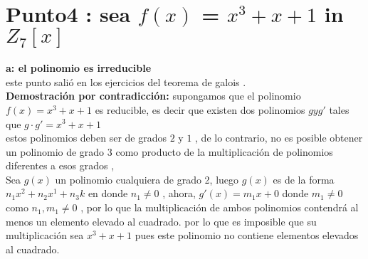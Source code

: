 \documentclass[10pt,a4paper]{article} %
\begin{document}
    \section{Punto4 :  sea $f(x)$ = $x ^{3}  + x + 1 $ in $Z_7[x]$}
    \textbf{a: el polinomio es irreducible}
    \\
    este punto salió en los ejercicios del teorema de galois .
    \\
    \textbf{Demostración por contradicción:} supongamos que el polinomio $f(x)
    = x ^{3} + x + 1  $ es reducible, es decir que existen dos polinomios $g y
    g' $ tales que $g \cdot g' = x ^{3} + x + 1  $
    \\
    estos polinomios deben ser de grados $2 $ y $1$ , de lo contrario, no es
    posible obtener un polinomio de grado $3$ como producto de la multiplicación de polinomios
    diferentes a esos grados ,
    \\
    Sea $g(x)$ un polinomio cualquiera de grado 2, luego $g(x)$ es de la forma
    $n_1 x ^{2} + n_2 x ^{1} + n_3 k  $ en donde $n_1 \not= 0$ , ahora, $g'(x)
    = m_1 x + 0 $ donde $m_1 \not= 0$
    \\
    como $n_1 , m_1 \not= 0$ , por lo que la multiplicación de ambos polinomios
    contendrá al menos un elemento elevado al cuadrado. por lo que es imposible
    que su multiplicación sea $ x ^{3} +x + 1 $ pues este polinomio no contiene
    elementos elevados al cuadrado.
























    \nocite{*}
    
    
\end{document}
